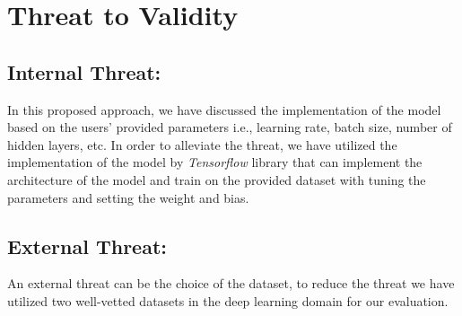 \section{Threat to Validity}
\label{sec:threat}
\subsection{Internal Threat:} In this proposed approach, we have discussed the implementation of the model based on the users' provided parameters i.e., learning rate, batch size, number of hidden layers, etc. In order to alleviate the threat, we have utilized the implementation of the model by \emph{Tensorflow} library that can implement the architecture of the model and train on the provided dataset with tuning the parameters and setting the weight and bias.
\subsection{External Threat:} An external threat can be the choice of the dataset, to reduce the threat we have utilized two well-vetted datasets in the deep learning domain for our evaluation.